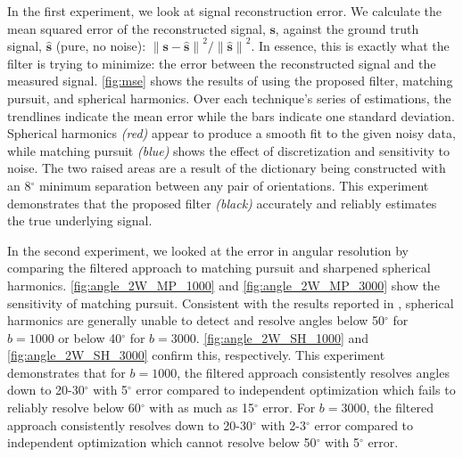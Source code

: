 \documentclass[letterpaper,hyperref,12pt]{gatech-thesis}
\renewcommand{\deg}{\ensuremath{^\circ}\xspace}
\renewcommand{\v}[1]{\ensuremath{\mathbf #1}\xspace}
\newcommand{\s}{\v s}
\newcommand{\bn}[1]{\ensuremath{b\!=\!#1}\xspace}
\newcommand{\bone}{\bn{1000}}
\newcommand{\bthree}{\bn{3000}}
\newcommand{\norm}[1]{\ensuremath{\|#1\|}}
\begin{document}
In the first experiment, we look at signal reconstruction error.  We calculate
the mean squared error of the reconstructed signal, \s, against the ground
truth signal, $\hat{\s}$ (pure, no noise): $ \norm{\s - \hat{\s}}^2 /
\norm{\hat{\s}}^2$.  In essence, this is exactly what the filter is trying to
minimize: the error between the reconstructed signal and the measured signal.
\autoref{fig:mse} shows the results of using the proposed filter, matching
pursuit, and spherical harmonics.  Over each technique's series of
estimations, the trendlines indicate the mean error while the bars indicate
one standard deviation.  Spherical harmonics \textit{(red)} appear to produce
a smooth fit to the given noisy data, while matching pursuit \textit{(blue)}
shows the effect of discretization and sensitivity to noise.  The two raised
areas are a result of the dictionary being constructed with an 8\deg minimum
separation between any pair of orientations.  This experiment demonstrates
that the proposed filter \textit{(black)} accurately and reliably estimates
the true underlying signal.

In the second experiment, we looked at the error in angular resolution by
comparing the filtered approach to matching pursuit and sharpened spherical
harmonics.  \autoref{fig:angle_2W_MP_1000} and \autoref{fig:angle_2W_MP_3000}
show the sensitivity of matching pursuit.  Consistent with the results
reported in \cite{Descoteaux2009tmi,Descoteaux2007mrm}, spherical harmonics are
generally unable to detect and resolve angles below 50\deg for \bone or below
40\deg for \bthree.  \autoref{fig:angle_2W_SH_1000} and
\autoref{fig:angle_2W_SH_3000} confirm this, respectively.  This experiment
demonstrates that for \bone, the filtered approach consistently resolves
angles down to 20-30\deg with 5\deg error compared to independent optimization
which fails to reliably resolve below 60\deg with as much as 15\deg error.
For \bthree, the filtered approach consistently resolves down to 20-30\deg
with 2-3\deg error compared to independent optimization which cannot resolve
below 50\deg with 5\deg error.
\end{document}
